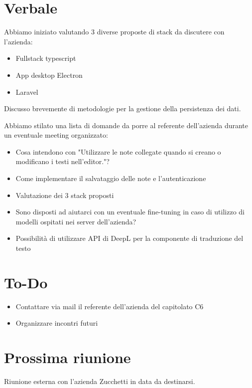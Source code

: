 \documentclass[a4paper,10pt]{article}
\begin{document}
\section*{Verbale}
Abbiamo iniziato valutando 3 diverse proposte di stack da discutere con l'azienda:\begin{itemize}
    \item Fullstack typescript
    \item App desktop Electron
    \item Laravel
\end{itemize}
Discusso brevemente di metodologie per la gestione della persistenza dei dati.

\vspace{1\baselineskip}

Abbiamo stilato una lista di domande da porre al referente dell'azienda durante un eventuale meeting organizzato:\begin{itemize}
    \item Cosa intendono con "Utilizzare le note collegate quando si creano o modificano i testi nell’editor."?
    \item Come implementare il salvataggio delle note e l'autenticazione
    \item Valutazione dei 3 stack proposti
    \item Sono disposti ad aiutarci con un eventuale fine-tuning in caso di utilizzo di modelli ospitati nei server dell'azienda?
    \item Possibilità di utilizzare API di DeepL per la componente di traduzione del testo
    
\end{itemize}
\newpage

\section*{To-Do}
\begin{itemize}
    \item Contattare via mail il referente dell'azienda del capitolato C6
    \item Organizzare incontri futuri
\end{itemize}

\section*{Prossima riunione}
Riunione esterna con l'azienda Zucchetti in data da destinarsi.
\end{document}
